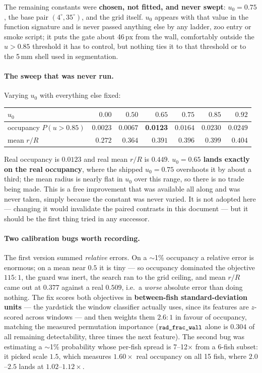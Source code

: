 \documentclass[11pt,a4paper]{article}
\newcommand{\uu}[1]{\ensuremath{\,\mathrm{#1}}}  %
\newcommand{\win}[1]{\textcolor{winc}{\textbf{#1}}}
\newcommand{\code}[1]{\texttt{\small #1}}
\begin{document}
The remaining constants were \textbf{chosen, not fitted, and never swept}: $u_0 = 0.75$,
the base pair $(4^\circ, 35^\circ)$, and the grid itself. $u_0$ appears with that value in
the function signature and is never passed anything else by any ladder, zoo entry or smoke
script; it puts the gate about 46\uu{px} from the wall, comfortably outside the
$u>0.85$ threshold it has to control, but nothing ties it to that threshold or to the
5\uu{mm} shell used in segmentation.

\paragraph{The sweep that was never run.} Varying $u_0$ with everything else fixed:

\begin{center}\small
\begin{tabular}{@{}lrrrrrr@{}}
\toprule
$u_0$ & $0.00$ & $0.50$ & $0.65$ & $\mathbf{0.75}$ & $0.85$ & $0.92$ \\
\midrule
occupancy $P(u>0.85)$ & $0.0023$ & $0.0067$ & \win{0.0123} & $0.0164$ & $0.0230$ & $0.0249$ \\
mean $r/R$            & $0.272$  & $0.364$  & $0.391$  & $0.396$  & $0.399$  & $0.404$ \\
\bottomrule
\end{tabular}
\end{center}

\noindent Real occupancy is $0.0123$ and real mean $r/R$ is $0.449$. \textbf{$u_0 = 0.65$
lands exactly on the real occupancy}, where the shipped $u_0 = 0.75$ overshoots it by about
a third; the mean radius is nearly flat in $u_0$ over this range, so there is no trade being
made. This is a free improvement that was available all along and was never taken, simply
because the constant was never varied. It is not adopted here --- changing it would
invalidate the paired contrasts in this document --- but it should be the first thing tried
in any successor.

\paragraph{Two calibration bugs worth recording.}
The first version summed \emph{relative} errors. On a $\sim$1\% occupancy a relative error
is enormous; on a mean near $0.5$ it is tiny --- so occupancy dominated the objective
$115{:}1$, the guard was inert, the search ran to the grid ceiling, and mean $r/R$ came out
at $0.377$ against a real $0.509$, i.e.\ a \emph{worse} absolute error than doing nothing.
The fix scores both objectives in \textbf{between-fish standard-deviation units} --- the
yardstick the window classifier actually uses, since its features are $z$-scored across
windows --- and then weights them $2.6{:}1$ in favour of occupancy, matching the measured
permutation importance ($\code{rad\_frac\_wall}$ alone is $0.304$ of all remaining
detectability, three times the next feature). The second bug was estimating a $\sim$1\%
probability whose per-fish spread is 7--12$\times$ from a 6-fish subset: it picked scale
$1.5$, which measures $1.60\times$ real occupancy on all 15 fish, where $2.0$--$2.5$ lands
at $1.02$--$1.12\times$.
\end{document}
